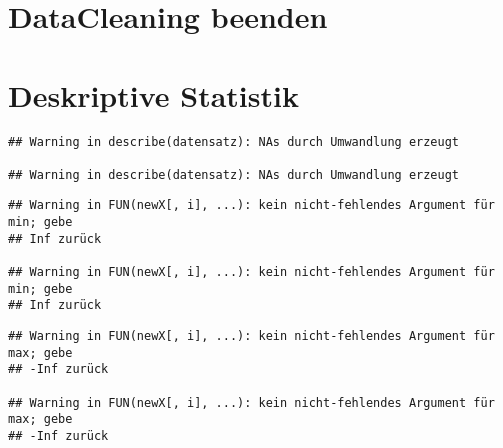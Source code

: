 \documentclass[]{article}
\begin{document}
\section{DataCleaning beenden}\label{datacleaning-beenden}

\section{Deskriptive Statistik}\label{deskriptive-statistik}

\begin{verbatim}
## Warning in describe(datensatz): NAs durch Umwandlung erzeugt

## Warning in describe(datensatz): NAs durch Umwandlung erzeugt
\end{verbatim}

\begin{verbatim}
## Warning in FUN(newX[, i], ...): kein nicht-fehlendes Argument für min; gebe
## Inf zurück

## Warning in FUN(newX[, i], ...): kein nicht-fehlendes Argument für min; gebe
## Inf zurück
\end{verbatim}

\begin{verbatim}
## Warning in FUN(newX[, i], ...): kein nicht-fehlendes Argument für max; gebe
## -Inf zurück

## Warning in FUN(newX[, i], ...): kein nicht-fehlendes Argument für max; gebe
## -Inf zurück
\end{verbatim}
\end{document}
